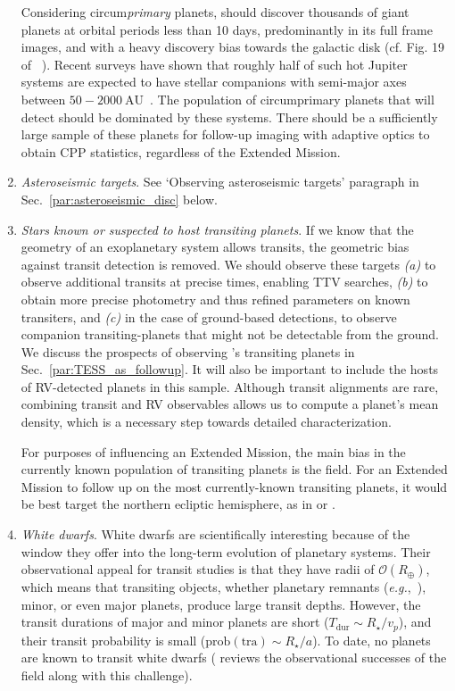 \begin{enumerate}
	Considering circum\textit{primary} planets, \tess should discover thousands of giant planets at orbital periods less than 10 days, predominantly in its full frame images, and with a heavy discovery bias towards the galactic disk (cf. Fig. 19 of ~).
	Recent surveys have shown that roughly half of such hot Jupiter systems are expected to have stellar companions with semi-major axes between $50-2000\ \mathrm{AU}$~\citep{ngo_friends_2016}.
	The population of circumprimary planets that \tess will detect should be dominated by these systems.
	There should be a sufficiently large sample of these planets for follow-up imaging with adaptive optics to obtain CPP statistics, regardless of the Extended Mission.
	
	\item \textit{Asteroseismic targets}. See `Observing asteroseismic targets' paragraph in Sec.~\ref{par:asteroseismic_disc} below.
	
	
	\item \textit{Stars known or suspected to host transiting planets}. 
	If we know that the geometry of an exoplanetary system allows transits, the geometric bias against transit detection is removed.
	We should observe these targets \textit{(a)} to observe additional transits at precise times, enabling TTV searches, \textit{(b)} to obtain more precise photometry and thus refined parameters on known transiters, and \textit{(c)} in the case of ground-based detections, to observe companion transiting-planets that might not be detectable from the ground.
 	We discuss the prospects of \tess observing \kepler\!'s transiting planets in Sec.~\ref{par:TESS_as_followup}.
 	It will also be important to include the hosts of RV-detected planets in this sample. 
 	Although transit alignments are rare, combining transit and RV observables allows us to compute a planet's mean density, which is a necessary step towards detailed characterization. 
 	
 	For purposes of influencing an Extended Mission, the main bias in the currently known population of transiting planets is the \kepler field.
 	For an Extended Mission to follow up on the most currently-known transiting planets, it would be best target the northern ecliptic hemisphere, as in \npole\:or \nhemi.
	
	\item \textit{White dwarfs}.
	White dwarfs are scientifically interesting because of the window they offer into the long-term evolution of planetary systems.
	Their observational appeal for transit studies is that they have radii of $\mathcal{O}(R_\oplus)$, which means that transiting objects, whether planetary remnants (\textit{e.g.},~\citep{vanderburg_disintegrating_2015}), minor, or even major planets, produce large transit depths.
	However, the transit durations of major and minor planets are short ($T_\mathrm{dur} \sim R_\star / v_p$), and their transit probability is small ($\mathrm{prob}(\mathrm{tra}) \sim R_\star / a $).
	To date, no planets are known to transit white dwarfs (\citet{veras_postMS_2016} reviews the observational successes of the field along with this challenge).
	

\end{enumerate}
